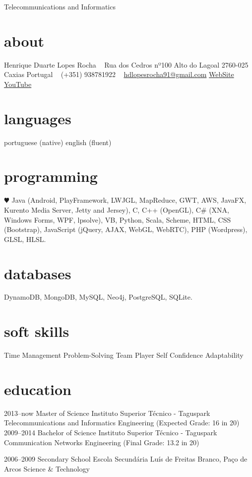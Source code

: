 \documentclass[]{friggeri-cv}
\begin{document}
       {Telecommunications and Informatics}

\begin{aside}
  \section{about}
    Henrique Duarte Lopes Rocha
    ~
    Rua dos Cedros nº100
    Alto do Lagoal
    2760-025 Caxias
    Portugal
    ~
    (+351) 938781922
    ~
    \href{mailto:hdlopesrocha91@gmail.com}{hdlopesrocha91@gmail.com}
    \href{http://web.ist.utl.pt/ist168621}{WebSite}
    \href{http://www.youtube.com/user/hdlopesrocha}{YouTube}
  \section{languages}
    portuguese (native)
    english (fluent)
  \section{programming}
    {\color{red} $\varheartsuit$} Java
	 (Android, PlayFramework, LWJGL, MapReduce, GWT, AWS, JavaFX, Kurento Media Server, Jetty and Jersey), C, C++ (OpenGL), C\# (XNA, Windows Forms, WPF, lpsolve), VB, Python, Scala, Scheme, HTML, CSS (Bootstrap), JavaScript (jQuery, AJAX, WebGL, WebRTC), PHP (Wordpress), GLSL, HLSL.  
   \section{databases}
	DynamoDB, MongoDB, MySQL, Neo4j, PostgreSQL, SQLite.
   \section{soft skills}
	Time Management
	Problem-Solving
	Team Player
	Self Confidence
	Adaptability
\end{aside}

\section{education}

\begin{entrylist}
   \entry
    {2013–now}
    {Master of Science}
    {Instituto Superior Técnico - Taguspark}
    {Telecommunications and Informatics Engineering (Expected Grade: 16 in 20)}
   \entry
    {2009–2014}
    {Bachelor of Science}
    {Instituto Superior Técnico - Taguspark}
    {Communication Networks Engineering (Final Grade: 13.2 in 20)}

   \entry
    {2006–2009}
    {Secondary School}
    {Escola Secundária Luís de Freitas Branco, Paço de Arcos}
    {Science \& Technology}

\end{entrylist}
\end{document}
